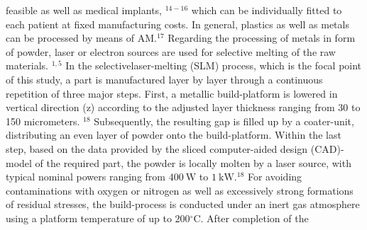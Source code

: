\documentclass[10pt]{article}
\begin{document}
feasible as well as medical implants, ${ }^{14-16}$ which can be individually fitted to each patient at fixed manufacturing costs. In general, plastics as well as metals can be processed by means of $\mathrm{AM} .{ }^{17}$ Regarding the processing of metals in form of powder, laser or electron sources are used for selective melting of the raw materials. ${ }^{1,5}$ In the selectivelaser-melting (SLM) process, which is the focal point of this study, a part is manufactured layer by layer through a continuous repetition of three major steps. First, a metallic build-platform is lowered in vertical direction (z) according to the adjusted layer thickness ranging from 30 to 150 micrometers. ${ }^{18}$ Subsequently, the resulting gap is filled up by a coater-unit, distributing an even layer of powder onto the build-platform. Within the last step, based on the data provided by the sliced computer-aided design (CAD)-model of the required part, the powder is locally molten by a laser source, with typical nominal powers ranging from $400 \mathrm{~W}$ to $1 \mathrm{~kW} .{ }^{18}$ For avoiding contaminations with oxygen or nitrogen as well as excessively strong formations of residual stresses, the build-process is conducted under an inert gas atmosphere using a platform temperature of up to $200{ }^{\circ} \mathrm{C}$. After completion of the\\
\end{document}
